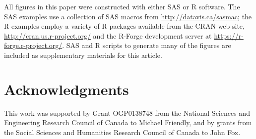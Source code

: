 \documentclass[11pt]{article}%
\begin{document}
All figures in this paper were constructed with either SAS or R software.
The SAS examples use a collection of SAS macros from \url{http://datavis.ca/sasmac}; the
R examples employ a variety of R packages available from the CRAN web site, \url{http://cran.us.r-project.org/}
and the R-Forge development server at \url{https://r-forge.r-project.org/}.
SAS and R scripts to generate many of the figures are included as supplementary materials for this article.


\section{Acknowledgments}

This work was supported by Grant OGP0138748 from the National Sciences and Engineering Research Council of Canada to Michael Friendly, and by grants from the Social Sciences and Humanities Research Council of Canada to John Fox.



\end{document}
